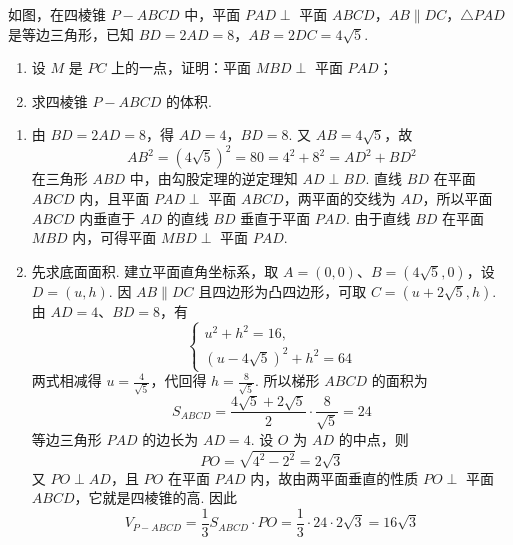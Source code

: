 \begin{problem}
如图，在四棱锥 \(P - ABCD\) 中，平面 \(PAD \perp\) 平面 \(ABCD\)，\(AB \parallel DC\)，\(\triangle PAD\) 是等边三角形，已知 \(BD = 2AD = 8\)，\(AB = 2DC = 4\sqrt{5}\).
\begin{enumerate}
\item 设 \(M\) 是 \(PC\) 上的一点，证明：平面 \(MBD \perp\) 平面 \(PAD\)；
\item 求四棱锥 \(P-ABCD\) 的体积.
\end{enumerate}

\end{problem}

\begin{solution}
\begin{enumerate}
\item 由 \(BD=2AD=8\)，得 \(AD=4\)，\(BD=8\). 又 \(AB=4\sqrt5\)，故
\[
AB^2=(4\sqrt5)^2=80=4^2+8^2=AD^2+BD^2
\]
在三角形 \(ABD\) 中，由勾股定理的逆定理知 \(AD\perp BD\). 直线 \(BD\) 在平面 \(ABCD\) 内，且平面 \(PAD\perp\) 平面 \(ABCD\)，两平面的交线为 \(AD\)，所以平面 \(ABCD\) 内垂直于 \(AD\) 的直线 \(BD\) 垂直于平面 \(PAD\). 由于直线 \(BD\) 在平面 \(MBD\) 内，可得平面 \(MBD\perp\) 平面 \(PAD\).

\item 先求底面面积. 建立平面直角坐标系，取 \(A=(0,0)\)、\(B=(4\sqrt5,0)\)，设 \(D=(u,h)\). 因 \(AB\parallel DC\) 且四边形为凸四边形，可取 \(C=(u+2\sqrt5,h)\). 由 \(AD=4\)、\(BD=8\)，有
\[
\begin{cases}
u^2+h^2=16,\\
(u-4\sqrt5)^2+h^2=64
\end{cases}
\]
两式相减得 \(u=\frac4{\sqrt5}\)，代回得 \(h=\frac8{\sqrt5}\). 所以梯形 \(ABCD\) 的面积为
\[
S_{ABCD}=\frac{4\sqrt5+2\sqrt5}{2}\cdot\frac8{\sqrt5}=24
\]
等边三角形 \(PAD\) 的边长为 \(AD=4\). 设 \(O\) 为 \(AD\) 的中点，则
\[
PO=\sqrt{4^2-2^2}=2\sqrt3
\]
又 \(PO\perp AD\)，且 \(PO\) 在平面 \(PAD\) 内，故由两平面垂直的性质 \(PO\perp\) 平面 \(ABCD\)，它就是四棱锥的高. 因此
\[
V_{P-ABCD}=\frac13S_{ABCD}\cdot PO
 =\frac13\cdot24\cdot2\sqrt3
 =16\sqrt3
\]
\end{enumerate}
\end{solution}

